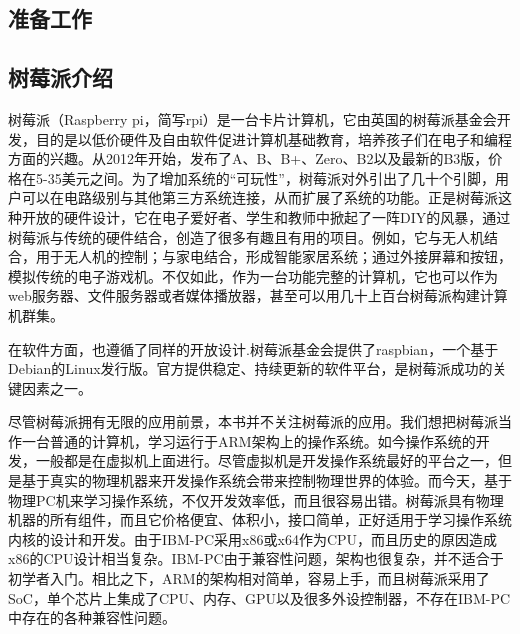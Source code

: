 \documentclass[main.tex]{subfiles}
\begin{document}
\begin{CJK*}{UTF8}{song}

\chapter{准备工作}
\section{树莓派介绍}

\par
树莓派（Raspberry pi，简写rpi）是一台卡片计算机，它由英国的树莓派基金会开发，目的是以低价硬件及自由软件促进计算机基础教育，培养孩子们在电子和编程方面的兴趣。从2012年开始，发布了A、B、B+、Zero、B2以及最新的B3版，价格在5-35美元之间。为了增加系统的“可玩性”，树莓派对外引出了几十个引脚，用户可以在电路级别与其他第三方系统连接，从而扩展了系统的功能。正是树莓派这种开放的硬件设计，它在电子爱好者、学生和教师中掀起了一阵DIY的风暴，通过树莓派与传统的硬件结合，创造了很多有趣且有用的项目。例如，它与无人机结合，用于无人机的控制；与家电结合，形成智能家居系统；通过外接屏幕和按钮，模拟传统的电子游戏机。不仅如此，作为一台功能完整的计算机，它也可以作为web服务器、文件服务器或者媒体播放器，甚至可以用几十上百台树莓派构建计算机群集。

\par
在软件方面，也遵循了同样的开放设计.树莓派基金会提供了raspbian，一个基于Debian的Linux发行版。官方提供稳定、持续更新的软件平台，是树莓派成功的关键因素之一。

\par
尽管树莓派拥有无限的应用前景，本书并不关注树莓派的应用。我们想把树莓派当作一台普通的计算机，学习运行于ARM架构上的操作系统。如今操作系统的开发，一般都是在虚拟机上面进行。尽管虚拟机是开发操作系统最好的平台之一，但是基于真实的物理机器来开发操作系统会带来控制物理世界的体验。而今天，基于物理PC机来学习操作系统，不仅开发效率低，而且很容易出错。树莓派具有物理机器的所有组件，而且它价格便宜、体积小，接口简单，正好适用于学习操作系统内核的设计和开发。由于IBM-PC采用x86或x64作为CPU，而且历史的原因造成x86的CPU设计相当复杂。IBM-PC由于兼容性问题，架构也很复杂，并不适合于初学者入门。相比之下，ARM的架构相对简单，容易上手，而且树莓派采用了SoC，单个芯片上集成了CPU、内存、GPU以及很多外设控制器，不存在IBM-PC中存在的各种兼容性问题。



\end{CJK*}
\end{document}
